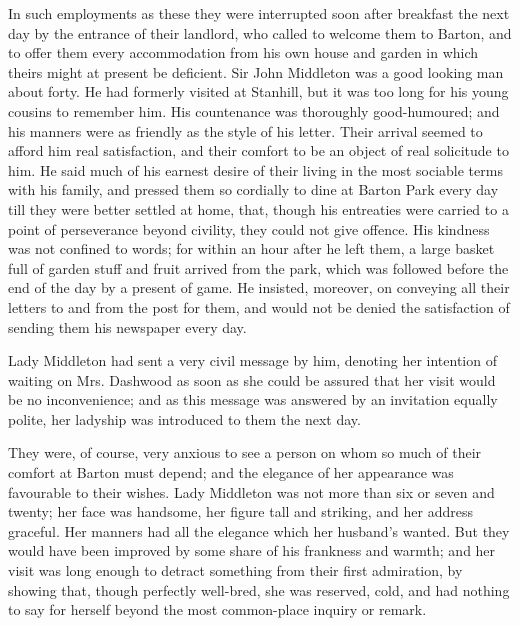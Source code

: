 In such employments as these they were interrupted soon after breakfast the next day by the entrance of their landlord, who called to welcome them to Barton, and to offer them every accommodation from his own house and garden in which theirs might at present be deficient. Sir John Middleton was a good looking man about forty. He had formerly visited at Stanhill, but it was too long for his young cousins to remember him. His countenance was thoroughly good-humoured; and his manners were as friendly as the style of his letter. Their arrival seemed to afford him real satisfaction, and their comfort to be an object of real solicitude to him. He said much of his earnest desire of their living in the most sociable terms with his family, and pressed them so cordially to dine at Barton Park every day till they were better settled at home, that, though his entreaties were carried to a point of perseverance beyond civility, they could not give offence. His kindness was not confined to words; for within an hour after he left them, a large basket full of garden stuff and fruit arrived from the park, which was followed before the end of the day by a present of game. He insisted, moreover, on conveying all their letters to and from the post for them, and would not be denied the satisfaction of sending them his newspaper every day.

Lady Middleton had sent a very civil message by him, denoting her intention of waiting on Mrs. Dashwood as soon as she could be assured that her visit would be no inconvenience; and as this message was answered by an invitation equally polite, her ladyship was introduced to them the next day.

They were, of course, very anxious to see a person on whom so much of their comfort at Barton must depend; and the elegance of her appearance was favourable to their wishes. Lady Middleton was not more than six or seven and twenty; her face was handsome, her figure tall and striking, and her address graceful. Her manners had all the elegance which her husband's wanted. But they would have been improved by some share of his frankness and warmth; and her visit was long enough to detract something from their first admiration, by showing that, though perfectly well-bred, she was reserved, cold, and had nothing to say for herself beyond the most common-place inquiry or remark.

